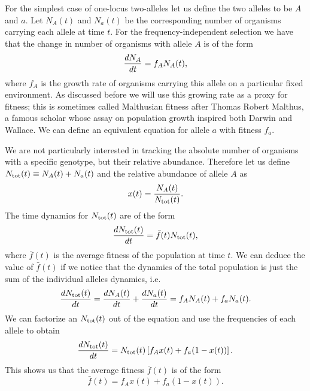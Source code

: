 For the simplest case of one-locus two-alleles let us define the two alleles to
be $A$ and $a$. Let $N_A(t)$ and $N_a(t)$ be the corresponding number of
organisms carrying each allele at time $t$. For the frequency-independent 
selection we have that the change in number of organisms with allele $A$ is of
the form
\begin{equation}
  {d{N_A} \over dt} = f_A N_A(t),
\end{equation}
where $f_A$ is the growth rate of organisms carrying this allele on a
particular fixed environment. As discussed before we will use this growing rate
as a proxy for fitness; this is sometimes called Malthusian fitness after
Thomas Robert Malthus, a famous scholar whose assay on population growth
inspired both Darwin and Wallace. We can define an equivalent equation for
allele $a$ with fitness $f_a$.

We are not particularly interested in tracking the absolute number of organisms
with a specific genotype, but their relative abundance. Therefore let us define
$N_{\text{tot}}(t) \equiv N_A(t) + N_a(t)$ and the relative abundance of allele $A$ as
\begin{equation}
  x(t) = {N_A(t) \over N_{\text{tot}}(t)}.
\end{equation}
The time dynamics for $N_{\text{tot}}(t)$ are of the form
\begin{equation}
  {d{N_{\text{tot}}(t)} \over dt} = \bar{f}(t) N_{\text{tot}}(t),
\end{equation}
where $\bar{f}(t)$ is the average fitness of the population at time $t$. We can
deduce the value of $\bar{f}(t)$ if we notice that the dynamics of the total
population is just the sum of the individual alleles dynamics, i.e.
\begin{equation}
  {d{N_{\text{tot}}(t)} \over dt} = {d{N_A(t)} \over dt} + {d{N_a(t)} \over dt} = f_A N_A(t) + f_a N_a(t).
\end{equation}
We can factorize an $N_{\text{tot}}(t)$ out of the equation and use the frequencies of
each allele to obtain
\begin{equation}
  {d{N_{\text{tot}}(t)} \over dt} = N_{\text{tot}}(t) \left[ f_A x(t) + f_a (1 - x(t)) \right].
\end{equation}
This shows us that the average fitness $\bar{f}(t)$ is of the form
\begin{equation}
  \bar{f}(t) = f_A x(t) + f_a (1 - x(t)).
\end{equation}


